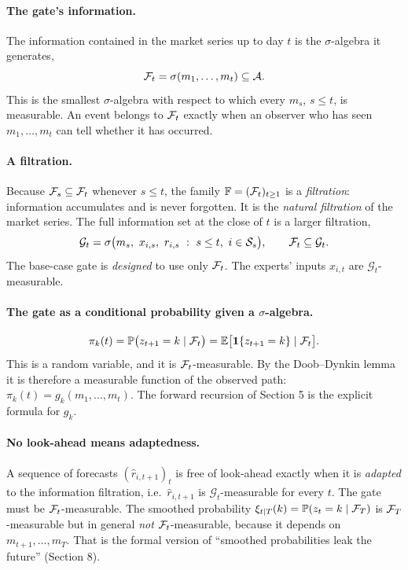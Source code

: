 \paragraph{The gate's information.} The information contained in the market series up to day $t$ is the $\sigma$-algebra it generates,
\begin{equation}
\mathcal{F}_t=\sigma(m_1,\dots,m_t)\subseteq\mathcal A.
\end{equation}
This is the smallest $\sigma$-algebra with respect to which every $m_s$, $s\le t$, is measurable. An event belongs to $\mathcal{F}_t$ exactly when an observer who has seen $m_1,\dots,m_t$ can tell whether it has occurred.

\paragraph{A filtration.} Because $\mathcal{F}_s\subseteq\mathcal{F}_t$ whenever $s\le t$, the family $\mathbb F=(\mathcal{F}_t)_{t\ge1}$ is a \emph{filtration}: information accumulates and is never forgotten. It is the \emph{natural filtration} of the market series. The full information set at the close of $t$ is a larger filtration,
\begin{equation}
\mathcal G_t=\sigma\big(m_s,\ x_{i,s},\ r_{i,s}\ :\ s\le t,\ i\in\mathcal S_{s}\big),\qquad \mathcal{F}_t\subseteq\mathcal G_t.
\end{equation}
The base-case gate is \emph{designed} to use only $\mathcal{F}_t$. The experts' inputs $x_{i,t}$ are $\mathcal G_t$-measurable.

\paragraph{The gate as a conditional probability given a $\sigma$-algebra.}
\begin{equation}
\pi_k(t)=\mathbb P\big(z_{t+1}=k\mid\mathcal{F}_t\big)=\mathbb{E}\big[\mathbf 1\{z_{t+1}=k\}\mid\mathcal{F}_t\big].
\end{equation}
This is a random variable, and it is $\mathcal{F}_t$-measurable. By the Doob--Dynkin lemma it is therefore a measurable function of the observed path: $\pi_k(t)=g_k(m_1,\dots,m_t)$. The forward recursion of Section 5 is the explicit formula for $g_k$.

\paragraph{No look-ahead means adaptedness.} A sequence of forecasts $(\hat r_{i,t+1})_t$ is free of look-ahead exactly when it is \emph{adapted} to the information filtration, i.e.\ $\hat r_{i,t+1}$ is $\mathcal G_t$-measurable for every $t$. The gate must be $\mathcal{F}_t$-measurable. The smoothed probability $\xi_{t\mid T}(k)=\mathbb P(z_t=k\mid\mathcal{F}_T)$ is $\mathcal{F}_T$-measurable but in general \emph{not} $\mathcal{F}_t$-measurable, because it depends on $m_{t+1},\dots,m_T$. That is the formal version of ``smoothed probabilities leak the future'' (Section 8).

